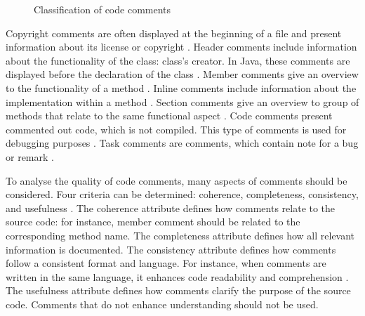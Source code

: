 \begin{figure}[H]
\centering
{}
\caption{Classification of code comments}
\cite{hassan2022code}
\label{fig:comment_classification}
\end{figure}





Copyright comments are often displayed at the beginning of a file and present information about its license or copyright \cite{steidl2013quality}. Header comments include information about the functionality of the class: class's creator. In Java, these comments are displayed before the declaration of the class \cite{hassan2022code}. Member comments give an overview to the functionality of a method \cite{steidl2013quality}. Inline comments include information about the implementation within a method \cite{steidl2013quality}. Section comments give an overview to group of methods that relate to the same functional aspect \cite{hassan2022code}. Code comments present commented out code, which is not compiled. This type of comments is used for debugging purposes \cite{steidl2013quality}. Task comments are comments, which contain note for a bug or remark \cite{steidl2013quality}.



To analyse the quality of code comments, many aspects of comments should be considered. Four criteria can be determined: coherence, completeness, consistency, and usefulness \cite{steidl2013quality}.
The coherence attribute defines how comments relate to the source code: for instance, member comment should be related to the corresponding method name.
The completeness attribute defines how all relevant information is documented. 
The consistency attribute defines how comments follow a consistent format and language. For instance, when comments are written in the same language, it enhances code readability and comprehension \cite{steidl2013quality}.
The usefulness attribute defines how comments clarify the purpose of the source code. Comments that do not enhance understanding should not be used. 


